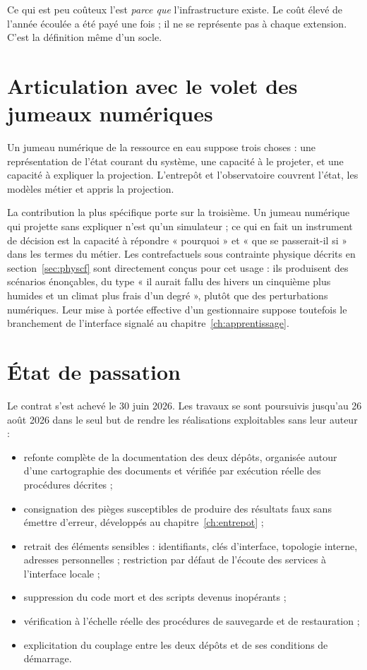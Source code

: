 Ce qui est peu coûteux l'est \emph{parce que} l'infrastructure existe. Le coût élevé de l'année
écoulée a été payé une fois ; il ne se représente pas à chaque extension. C'est la définition
même d'un socle.

\section{Articulation avec le volet des jumeaux numériques}

Un jumeau numérique de la ressource en eau suppose trois choses : une représentation de l'état
courant du système, une capacité à le projeter, et une capacité à expliquer la projection.
L'entrepôt et l'observatoire couvrent l'état, les modèles métier et appris la projection.

La contribution la plus spécifique porte sur la troisième. Un jumeau numérique qui projette sans
expliquer n'est qu'un simulateur ; ce qui en fait un instrument de décision est la capacité à
répondre « pourquoi » et « que se passerait-il si » dans les termes du métier. Les contrefactuels
sous contrainte physique décrits en section~\ref{sec:physcf} sont directement conçus pour cet
usage : ils produisent des scénarios énonçables, du type « il aurait fallu des hivers un
cinquième plus humides et un climat plus frais d'un degré », plutôt que des perturbations
numériques. Leur mise à portée effective d'un gestionnaire suppose toutefois le branchement de
l'interface signalé au chapitre~\ref{ch:apprentissage}.

\section{État de passation}

Le contrat s'est achevé le 30 juin 2026. Les travaux se sont poursuivis jusqu'au 26 août 2026
dans le seul but de rendre les réalisations exploitables sans leur auteur :

\begin{itemize}
  \item refonte complète de la documentation des deux dépôts, organisée autour d'une
  cartographie des documents et vérifiée par exécution réelle des procédures décrites ;
  \item consignation des pièges susceptibles de produire des résultats faux sans émettre
  d'erreur, développés au chapitre~\ref{ch:entrepot} ;
  \item retrait des éléments sensibles : identifiants, clés d'interface, topologie interne,
  adresses personnelles ; restriction par défaut de l'écoute des services à l'interface locale ;
  \item suppression du code mort et des scripts devenus inopérants ;
  \item vérification à l'échelle réelle des procédures de sauvegarde et de restauration ;
  \item explicitation du couplage entre les deux dépôts et de ses conditions de démarrage.
\end{itemize}

